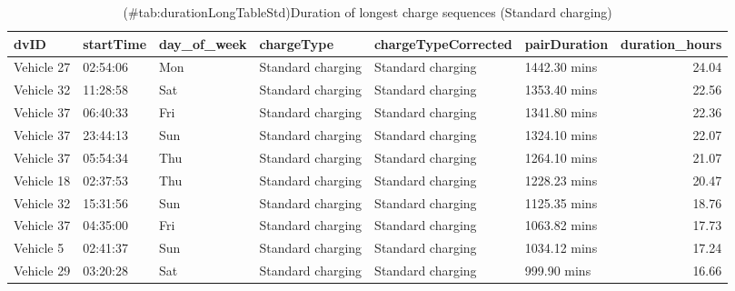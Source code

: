 \documentclass[]{article}
\begin{document}
\begin{table}[t]

\caption{(\#tab:durationLongTableStd)Duration of longest charge sequences (Standard charging)}
\centering
\begin{tabular}{l|l|l|l|l|l|r}
\hline
dvID & startTime & day\_of\_week & chargeType & chargeTypeCorrected & pairDuration & duration\_hours\\
\hline
Vehicle 27 & 02:54:06 & Mon & Standard charging & Standard charging & 1442.30 mins & 24.04\\
\hline
Vehicle 32 & 11:28:58 & Sat & Standard charging & Standard charging & 1353.40 mins & 22.56\\
\hline
Vehicle 37 & 06:40:33 & Fri & Standard charging & Standard charging & 1341.80 mins & 22.36\\
\hline
Vehicle 37 & 23:44:13 & Sun & Standard charging & Standard charging & 1324.10 mins & 22.07\\
\hline
Vehicle 37 & 05:54:34 & Thu & Standard charging & Standard charging & 1264.10 mins & 21.07\\
\hline
Vehicle 18 & 02:37:53 & Thu & Standard charging & Standard charging & 1228.23 mins & 20.47\\
\hline
Vehicle 32 & 15:31:56 & Sun & Standard charging & Standard charging & 1125.35 mins & 18.76\\
\hline
Vehicle 37 & 04:35:00 & Fri & Standard charging & Standard charging & 1063.82 mins & 17.73\\
\hline
Vehicle 5 & 02:41:37 & Sun & Standard charging & Standard charging & 1034.12 mins & 17.24\\
\hline
Vehicle 29 & 03:20:28 & Sat & Standard charging & Standard charging & 999.90 mins & 16.66\\
\hline
\end{tabular}
\end{table}
\end{document}
